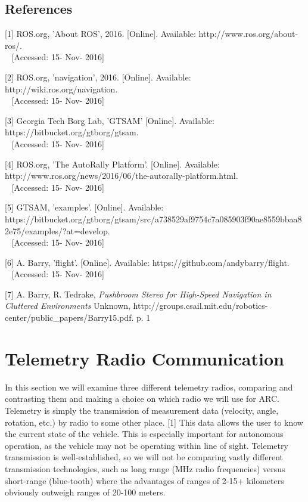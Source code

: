 \documentclass[compsoc,draftclsnofoot,onecolumn,10pt]{IEEEtran}
\begin{document}
\subsection{References}
[1] ROS.org, 'About ROS', 2016. [Online]. Available: http://www.ros.org/about-ros/.\\~
[Accessed: 15- Nov- 2016]

[2] ROS.org, 'navigation', 2016. [Online]. Available: http://wiki.ros.org/navigation.\\~
[Accessed: 15- Nov- 2016]

[3] Georgia Tech Borg Lab, 'GTSAM' [Online]. Available:
https://bitbucket.org/gtborg/gtsam.\\~
[Accessed: 15- Nov- 2016]

[4] ROS.org, 'The AutoRally Platform'. [Online]. Available: http://www.ros.org/news/2016/06/the-autorally-platform.html.\\~
[Accessed: 15- Nov- 2016]

[5] GTSAM, 'examples'. [Online]. Available:
https://bitbucket.org/gtborg/gtsam/src/a738529af9754c7a085903f90ae8559bbaa82e75/examples/?at=develop.\\~
[Accessed: 15- Nov- 2016]

[6] A. Barry, 'flight'. [Online]. Available:
https://github.com/andybarry/flight.\\~
[Accessed: 15- Nov- 2016]

[7] A. Barry, R. Tedrake, \textit{Pushbroom Stereo for High-Speed Navigation in
Cluttered Environments} Unknown,
http://groups.csail.mit.edu/robotics-center/public\_papers/Barry15.pdf. p. 1

\newpage

\section{Telemetry Radio Communication}
In this section we will examine three different telemetry radios, comparing and
contrasting them and making a choice on which radio we will use for ARC.
Telemetry is simply the transmission of measurement data (velocity, angle,
rotation, etc.) by radio to some other place. [1] This data allows the user to know the current state of the vehicle. This is especially
important for autonomous operation, as the vehicle may not be operating within
line of sight. Telemetry transmission is
well-established, so we will not be comparing vastly different transmission
technologies, such as long range (MHz radio frequencies) versus short-range
(blue-tooth) where the advantages of ranges of 2-15+ kilometers obviously
outweigh ranges of 20-100 meters.
\end{document}
